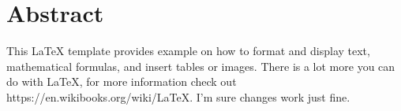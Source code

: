 \chapter{Abstract}
		This \LaTeX{} template provides example on how to format and display text, 
		mathematical formulas, and insert tables or images. There is a lot more you 
		can do with \LaTeX{}, for more information check out https://en.wikibooks.org/wiki/LaTeX.
		I'm sure changes work just fine. 
